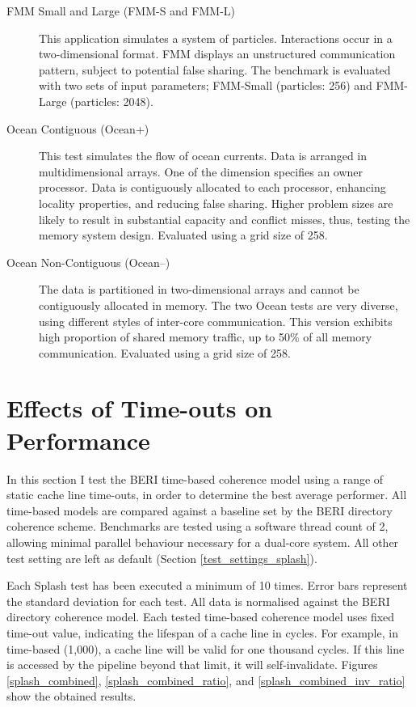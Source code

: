 \begin{description}
			\item[FMM Small and Large (FMM-S and FMM-L)] This application simulates a system of particles. Interactions occur in a two-dimensional format. FMM displays an unstructured communication pattern, subject to potential false sharing. The benchmark is evaluated with two sets of input parameters; FMM-Small (particles: 256) and FMM-Large (particles: 2048).
			
			\item[Ocean Contiguous (Ocean+)] This test simulates the flow of ocean currents. 
			Data is arranged in multidimensional arrays. One of the dimension specifies an owner processor. Data is contiguously allocated to each processor, enhancing locality properties, and reducing false sharing.
			Higher problem sizes are likely to result in substantial capacity and conflict misses, thus, testing the memory system design. Evaluated using a grid size of 258.
			
			\item[Ocean Non-Contiguous (Ocean--)] The data is partitioned in two-dimensional arrays and cannot be contiguously allocated in memory. The two Ocean tests are very diverse, using different styles of inter-core communication. This version exhibits high proportion of shared memory traffic, up to 50\% of all memory communication. Evaluated using a grid size of 258.
		\end{description}
		
		
		
	\section{Effects of Time-outs on Performance}
		In this section I test the BERI time-based coherence model using a range of static cache line time-outs, in order to determine the best average performer. All time-based models are compared against a baseline set by the BERI directory coherence scheme. Benchmarks are tested using a software thread count of 2, allowing minimal parallel behaviour necessary for a dual-core system. All other test setting are left as default (Section \ref{test_settings_splash}).
		
		Each Splash test has been executed a minimum of 10 times. Error bars represent the standard deviation for each test. All data is normalised against the BERI directory coherence model. Each tested time-based coherence model uses fixed time-out value, indicating the lifespan of a cache line in cycles. For example, in time-based (1,000), a cache line will be valid for one thousand cycles. If this line is accessed by the pipeline beyond that limit, it will self-invalidate. Figures \ref{splash_combined}, \ref{splash_combined_ratio}, and \ref{splash_combined_inv_ratio} show the obtained results. 
		

